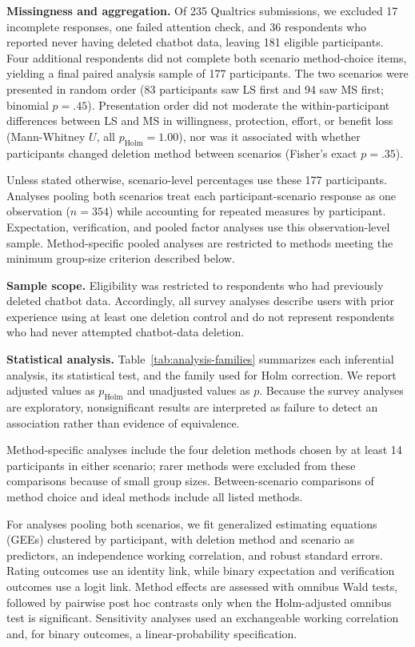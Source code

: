\documentclass[conference,compsoc]{IEEEtran}
\begin{document}
\textbf{Missingness and aggregation.} Of 235 Qualtrics submissions, we excluded 17 incomplete responses, one failed attention check, and 36 respondents who reported never having deleted chatbot data, leaving 181 eligible participants. Four additional respondents did not complete both scenario method-choice items, yielding a final paired analysis sample of 177 participants. The two scenarios were presented in random order (83 participants saw LS first and 94 saw MS first; binomial $p=.45$). Presentation order did not moderate the within-participant differences between LS and MS in willingness, protection, effort, or benefit loss (Mann-Whitney $U$, all $p_{\mathrm{Holm}}=1.00$), nor was it associated with whether participants changed deletion method between scenarios (Fisher's exact $p=.35$).

Unless stated otherwise, scenario-level percentages use these 177 participants. Analyses pooling both scenarios treat each participant-scenario response as one observation ($n=354$) while accounting for repeated measures by participant. Expectation, verification, and pooled factor analyses use this observation-level sample. Method-specific pooled analyses are restricted to methods meeting the minimum group-size criterion described below.

\textbf{Sample scope.} Eligibility was restricted to respondents who had previously deleted chatbot data. Accordingly, all survey analyses describe users with prior experience using at least one deletion control and do not represent respondents who had never attempted chatbot-data deletion.

\textbf{Statistical analysis.} Table~\ref{tab:analysis-families} summarizes each inferential analysis, its statistical test, and the family used for Holm correction. We report adjusted values as $p_{\mathrm{Holm}}$ and unadjusted values as $p$. Because the survey analyses are exploratory, nonsignificant results are interpreted as failure to detect an association rather than evidence of equivalence.

Method-specific analyses include the four deletion methods chosen by at least 14 participants in either scenario; rarer methods were excluded from these comparisons because of small group sizes. Between-scenario comparisons of method choice and ideal methods include all listed methods.

For analyses pooling both scenarios, we fit generalized estimating equations (GEEs) clustered by participant, with deletion method and scenario as predictors, an independence working correlation, and robust standard errors. Rating outcomes use an identity link, while binary expectation and verification outcomes use a logit link. Method effects are assessed with omnibus Wald tests, followed by pairwise post hoc contrasts only when the Holm-adjusted omnibus test is significant. Sensitivity analyses used an exchangeable working correlation and, for binary outcomes, a linear-probability specification.
\end{document}

